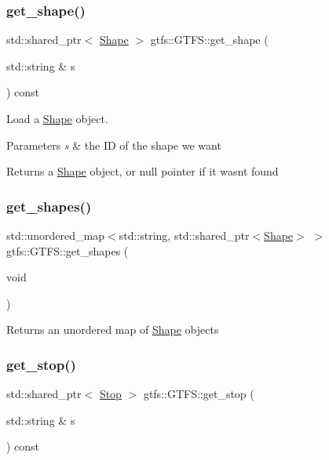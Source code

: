 \subsubsection{\texorpdfstring{get\+\_\+shape()}{get\_shape()}}
{\footnotesize\ttfamily std\+::shared\+\_\+ptr$<$ \hyperlink{classgtfs_1_1Shape}{Shape} $>$ gtfs\+::\+G\+T\+F\+S\+::get\+\_\+shape (\begin{DoxyParamCaption}\item[{std\+::string \&}]{s }\end{DoxyParamCaption}) const}

Load a \hyperlink{classgtfs_1_1Shape}{Shape} object. 
\begin{DoxyParams}{Parameters}
{\em s} & the ID of the shape we want \\
\hline
\end{DoxyParams}
\begin{DoxyReturn}{Returns}
a \hyperlink{classgtfs_1_1Shape}{Shape} object, or null pointer if it wasn\textquotesingle{}t found 
\end{DoxyReturn}
\mbox{\label{classgtfs_1_1GTFS_a91ada6a3f02e3ee9b6a723a6c6fc50af}} 
\subsubsection{\texorpdfstring{get\+\_\+shapes()}{get\_shapes()}}
{\footnotesize\ttfamily std\+::unordered\+\_\+map$<$std\+::string, std\+::shared\+\_\+ptr$<$\hyperlink{classgtfs_1_1Shape}{Shape}$>$ $>$ gtfs\+::\+G\+T\+F\+S\+::get\+\_\+shapes (\begin{DoxyParamCaption}\item[{void}]{ }\end{DoxyParamCaption})\hspace{0.3cm}{\ttfamily [inline]}}

\begin{DoxyReturn}{Returns}
an unordered map of \hyperlink{classgtfs_1_1Shape}{Shape} objects 
\end{DoxyReturn}
\mbox{\label{classgtfs_1_1GTFS_a34304835b203901a972d40cc4f1d060a}} 
\subsubsection{\texorpdfstring{get\+\_\+stop()}{get\_stop()}}
{\footnotesize\ttfamily std\+::shared\+\_\+ptr$<$ \hyperlink{classgtfs_1_1Stop}{Stop} $>$ gtfs\+::\+G\+T\+F\+S\+::get\+\_\+stop (\begin{DoxyParamCaption}\item[{std\+::string \&}]{s }\end{DoxyParamCaption}) const}

